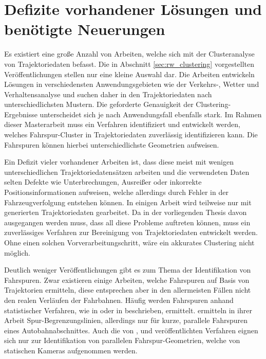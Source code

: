 \section{Defizite vorhandener Lösungen und benötigte Neuerungen}
\label{sec:rw_deficites}

Es existiert eine große Anzahl von Arbeiten, welche sich mit der Clusteranalyse von Trajektoriedaten
befasst. Die in Abschnitt \ref{sec:rw_clustering} vorgestellten Veröffentlichungen stellen nur eine
kleine Auswahl dar.
Die Arbeiten entwickeln Lösungen in verschiedensten Anwendungsgebieten wie der Verkehrs-, Wetter und Verhaltensanalyse
und suchen daher in den Trajektoriedaten nach unterschiedlichsten Mustern. Die geforderte Genauigkeit der
Clustering-Ergebnisse unterscheidet sich je nach Anwendungsfall ebenfalls stark.
Im Rahmen dieser Masterarbeit muss ein Verfahren identifiziert und entwickelt werden, welches Fahrspur-Cluster
in Trajektoriedaten zuverlässig identifizieren kann. Die Fahrspuren können hierbei unterschiedlichste
Geometrien aufweisen.

Ein Defizit vieler vorhandener Arbeiten ist, dass diese meist mit wenigen unterschiedlichen
Trajektoriedatensätzen arbeiten und die verwendeten Daten selten Defekte wie Unterbrechungen,
Ausreißer oder inkorrekte Positionsinformationen aufweisen, welche allerdings durch Fehler in der Fahrzeugverfolgung entstehen können.
In einigen Arbeit wird teilweise nur mit generierten Trajektoriedaten gearbeitet.
Da in der vorliegenden Thesis davon ausgegangen werden muss, dass all diese Probleme auftreten können,
muss ein zuverlässiges Verfahren zur Bereinigung von Trajektoriedaten entwickelt werden. Ohne einen solchen Vorverarbeitungschritt,
wäre ein akkurates Clustering nicht möglich.

Deutlich weniger Veröffentlichungen gibt es zum Thema der Identifikation von Fahrspuren. Zwar existieren
einige Arbeiten, welche Fahrspuren auf Basis von Trajektorien ermitteln, diese entsprechen aber
in den allermeisten Fällen nicht den realen Verläufen der Fahrbahnen. Häufig werden Fahrspuren
anhand statistischer Verfahren, wie in \cite[]{WeimingHu2006} oder in \cite[]{Teng2015} beschrieben, ermittelt.
\cite[]{Hsieh2006} ermitteln in ihrer Arbeit Spur-Begrenzungslinien, allerdings nur für kurze, parallele
Fahrspuren eines Autobahnabschnittes. Auch die von \cite[]{Liu2010}, \cite[]{Sochor2014} und \cite[]{Chen2013}
veröffentlichten Verfahren eignen sich nur zur Identifikation von parallelen Fahrspur-Geometrien,
welche von statischen Kameras aufgenommen werden.


